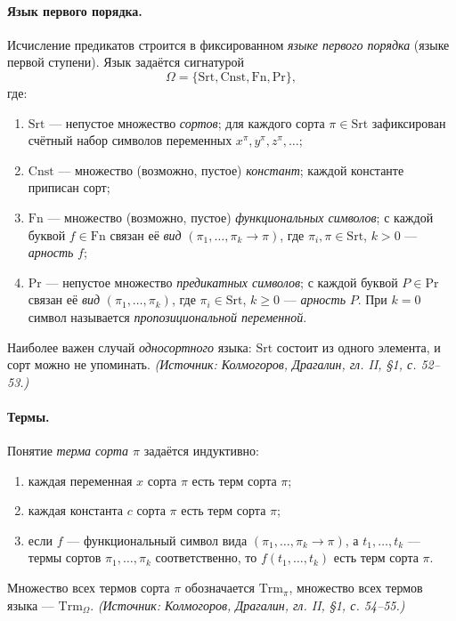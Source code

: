 \documentclass[a4paper,12pt]{article}
\begin{document}
\paragraph{Язык первого порядка.} Исчисление предикатов строится в фиксированном \emph{языке первого порядка} (языке первой ступени). Язык задаётся сигнатурой
\[
\Omega=\{\mathrm{Srt},\mathrm{Cnst},\mathrm{Fn},\mathrm{Pr}\},
\]
где:
\begin{enumerate}[label=\arabic*)]
\item \(\mathrm{Srt}\) — непустое множество \emph{сортов}; для каждого сорта \(\pi\in\mathrm{Srt}\) зафиксирован счётный набор символов переменных \(x^\pi,y^\pi,z^\pi,\ldots\);
\item \(\mathrm{Cnst}\) — множество (возможно, пустое) \emph{констант}; каждой константе приписан сорт;
\item \(\mathrm{Fn}\) — множество (возможно, пустое) \emph{функциональных символов}; с каждой буквой \(f\in\mathrm{Fn}\) связан её \emph{вид} \((\pi_1,\ldots,\pi_k\to\pi)\), где \(\pi_i,\pi\in\mathrm{Srt}\), \(k>0\) — \emph{арность} \(f\);
\item \(\mathrm{Pr}\) — непустое множество \emph{предикатных символов}; с каждой буквой \(P\in\mathrm{Pr}\) связан её \emph{вид} \((\pi_1,\ldots,\pi_k)\), где \(\pi_i\in\mathrm{Srt}\), \(k\ge 0\) — \emph{арность} \(P\). При \(k=0\) символ называется \emph{пропозициональной переменной}.
\end{enumerate}
Наиболее важен случай \emph{односортного} языка: \(\mathrm{Srt}\) состоит из одного элемента, и сорт можно не упоминать.
\textit{(Источник: Колмогоров, Драгалин, гл. II, §1, с. 52--53.)}

\paragraph{Термы.} Понятие \emph{терма сорта \(\pi\)} задаётся индуктивно:
\begin{enumerate}[label=\arabic*)]
\item каждая переменная \(x\) сорта \(\pi\) есть терм сорта \(\pi\);
\item каждая константа \(c\) сорта \(\pi\) есть терм сорта \(\pi\);
\item если \(f\) — функциональный символ вида \((\pi_1,\ldots,\pi_k\to\pi)\), а \(t_1,\ldots,t_k\) — термы сортов \(\pi_1,\ldots,\pi_k\) соответственно, то \(f(t_1,\ldots,t_k)\) есть терм сорта \(\pi\).
\end{enumerate}
Множество всех термов сорта \(\pi\) обозначается \(\mathrm{Trm}_\pi\), множество всех термов языка — \(\mathrm{Trm}_\Omega\).
\textit{(Источник: Колмогоров, Драгалин, гл. II, §1, с. 54--55.)}
\end{document}
